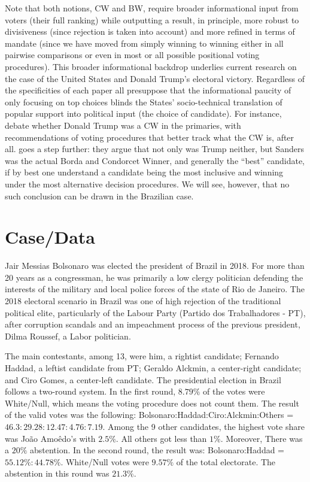 \documentclass[hidelinks,11pt]{article}
\begin{document}
Note that both notions, CW and BW, require broader informational input from
voters (their full ranking) while outputting a result, in principle, more robust
to divisiveness (since rejection is taken into account) and more refined in
terms of mandate (since we have moved from simply winning to winning either in
all pairwise comparisons or even in most or all possible positional voting
procedures). This broader informational backdrop underlies current research on
the case of the United States and Donald Trump's electoral victory. Regardless
of the specificities of each paper all presuppose that the informational paucity
of only focusing on top choices blinds the States' socio-technical translation
of popular support into political input (the choice of candidate). For instance,
\textcite{potthoff2021condorcet, woon2020trump, kurrild2018trump} debate whether
Donald Trump was a CW in the primaries, with recommendations of
voting procedures that better track what the CW is, after all.
\textcite{igersheim22_compar_votin_method} goes a step further: they argue that
not only was Trump neither, but Sanders was the actual Borda and Condorcet
Winner, and generally the ``best'' candidate, if by best one understand a
candidate being the most inclusive and winning under the most alternative
decision procedures. We will see, however, that no such conclusion can be drawn
in the Brazilian case.

\section{Case/Data}

Jair Messias Bolsonaro was elected the president of Brazil in 2018. For more
than 20 years as a congressman, he was primarily a low clergy politician
defending the interests of the military and local police forces of the state of
Rio de Janeiro. The 2018 electoral scenario in Brazil was one of high rejection
of the traditional political elite, particularly of the Labour Party (Partido
dos Trabalhadores - PT), after corruption scandals and an impeachment process of
the previous president, Dilma Roussef, a Labor politician.


The main contestants,
among 13, were him, a rightist candidate; Fernando Haddad, a leftist candidate
from PT; Geraldo Alckmin, a center-right candidate; and Ciro Gomes, a
center-left candidate. The presidential election in Brazil follows a two-round
system. In the first round, \(8.79\%\) of the votes were White/Null, which means
the voting procedure does not count them. The result of the valid votes was the
following: Bolsonaro:Haddad:Ciro:Alckmin:Others =
\(46.3:29.28:12.47:4.76:7.19 \). Among the 9 other candidates, the highest vote
share was Jo{\~a}o Amo{\^e}do's with \(2.5\%\). All others got less than \(1\%\).
Moreover, There was a \(20\%\) abstention. In the second round, the result was:
Bolsonaro:Haddad = \(55.12\% : 44.78\% \). White/Null votes were \(9.57\%\) of
the total electorate. The abstention in this round was \(21.3\%\).
\end{document}
